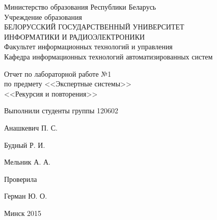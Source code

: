 \thispagestyle{empty}
\setlength{\parindent}{0ex} %

\begin{center}
  Министерство образования Республики Беларусь \\
  \smallskip
  Учреждение образования \\
  БЕЛОРУССКИЙ ГОСУДАРСТВЕННЫЙ УНИВЕРСИТЕТ \\
  ИНФОРМАТИКИ И РАДИОЭЛЕКТРОНИКИ \\
  \smallskip
  Факультет информационных технологий и управления \\
  \smallskip
  Кафедра информационных технологий автоматизированных систем
\end{center}

\vspace{40mm}

\begin{center}
  Отчет по лабораторной работе №1 \\
  по предмету <<Экспертные системы>> \\
  <<Рекурсия и повторения>> 
\end{center}

\vspace{45mm}

\begin{minipage}{.55\linewidth}
    Выполнили студенты группы 120602
    \vspace{12mm}
\end{minipage}
\hfill
\begin{minipage}{.4\linewidth}
  \begin{flushright}
    Анашкевич П. С.

    Будный Р. И.

    Мельник А. А.
  \end{flushright}
\end{minipage}

\vspace{10mm}

\begin{minipage}{.55\linewidth}
    Проверила
\end{minipage}
\hfill
\begin{minipage}{.4\linewidth}
  \begin{flushright}
    Герман Ю. О.

  \end{flushright}
\end{minipage}

\vspace{40mm}
\begin{center}
  Минск 2015
\end{center}

\setlength{\parindent}{5ex} %
